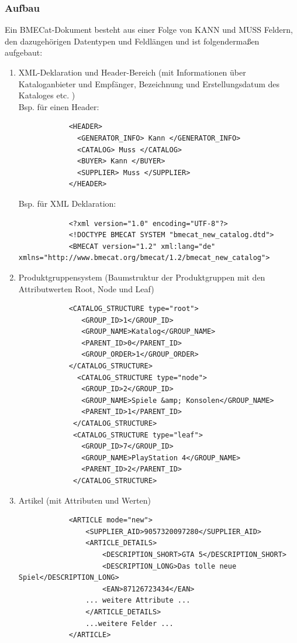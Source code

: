 	\subsubsection{Aufbau}
	
	Ein BMECat-Dokument besteht aus einer Folge von KANN und MUSS Feldern, den dazugehörigen Datentypen und Feldlängen und ist folgendermaßen aufgebaut:
		
		\begin{enumerate}
		
			\item XML-Deklaration und Header-Bereich (mit Informationen über Kataloganbieter und Empfänger, Bezeichnung und Erstellungsdatum des Kataloges etc.  )
				\\Bsp. für einen Header:
			\begin{lstlisting}
			<HEADER>
			  <GENERATOR_INFO> Kann </GENERATOR_INFO>
			  <CATALOG> Muss </CATALOG>
			  <BUYER> Kann </BUYER>
			  <SUPPLIER> Muss </SUPPLIER>
			</HEADER>
			\end{lstlisting}
			Bsp. für XML Deklaration:
			\begin{lstlisting}
			<?xml version="1.0" encoding="UTF-8"?>
			<!DOCTYPE BMECAT SYSTEM "bmecat_new_catalog.dtd">
			<BMECAT version="1.2" xml:lang="de" xmlns="http://www.bmecat.org/bmecat/1.2/bmecat_new_catalog">
			\end{lstlisting}
			\item Produktgruppensystem (Baumstruktur der Produktgruppen mit den Attributwerten Root, Node und Leaf)
			\begin{lstlisting}
			<CATALOG_STRUCTURE type="root">
			   <GROUP_ID>1</GROUP_ID>
			   <GROUP_NAME>Katalog</GROUP_NAME>
			   <PARENT_ID>0</PARENT_ID>
			   <GROUP_ORDER>1</GROUP_ORDER>
			</CATALOG_STRUCTURE>
			  <CATALOG_STRUCTURE type="node">
			   <GROUP_ID>2</GROUP_ID>
			   <GROUP_NAME>Spiele &amp; Konsolen</GROUP_NAME>
			   <PARENT_ID>1</PARENT_ID>
			 </CATALOG_STRUCTURE>
			 <CATALOG_STRUCTURE type="leaf">
			   <GROUP_ID>7</GROUP_ID>
			   <GROUP_NAME>PlayStation 4</GROUP_NAME>
			   <PARENT_ID>2</PARENT_ID>
			 </CATALOG_STRUCTURE>
			\end{lstlisting}
			
			
			
			\item Artikel (mit Attributen und Werten)
			
			\begin{lstlisting}
			<ARTICLE mode="new">
				<SUPPLIER_AID>9057320097280</SUPPLIER_AID>
				<ARTICLE_DETAILS>
				   	<DESCRIPTION_SHORT>GTA 5</DESCRIPTION_SHORT>
					<DESCRIPTION_LONG>Das tolle neue Spiel</DESCRIPTION_LONG>
					<EAN>87126723434</EAN>
				... weitere Attribute ...
				</ARTICLE_DETAILS>
				...weitere Felder ...
			</ARTICLE>
			\end{lstlisting}
			

\end{enumerate}

